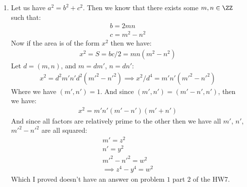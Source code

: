 \begin{enumerate}[label=]
    \item 
        Let us have $a^2 = b^2 + c^2$. Then we know that there exists some $m, n \in \ZZ$ such that:
        \begin{gather*}
            b = 2mn \\
            c = m^2 - n^2
        \end{gather*}
        Now if the area is of the form $x^2$ then we have:
        \begin{gather*}
            x^2 = S = bc/2 =mn (m^2 - n^2)
        \end{gather*}
        Let $d = (m, n)$, and $m = dm'$, $n = dn'$:
        \begin{gather*}
            x^2 = d^2 m'n' d^2(m'^2 - n'^2) \implies x^2/d^4 = m'n'(m'^2 - n'^2)
        \end{gather*}
        Where we have $(m', n') = 1$. And since $(m', n') = (m' - n', n')$, then we have:
        \begin{gather*}
            x^2 = m'n'(m'- n') (m' + n')
        \end{gather*}
        And since all factors are relatively prime to the other then we have all $m'$, $n'$, $m'^2 - n'^2$ are all squared:
        \begin{gather*}
            m' = z^2 \\
            n' = y^2 \\
            m'^2 - n'^2 = w^2 \\
            \implies z^4 - y^4 = w^2
        \end{gather*}
        Which I proved doesn't have an answer on problem $1$ part $2$ of the HW7.
\end{enumerate}